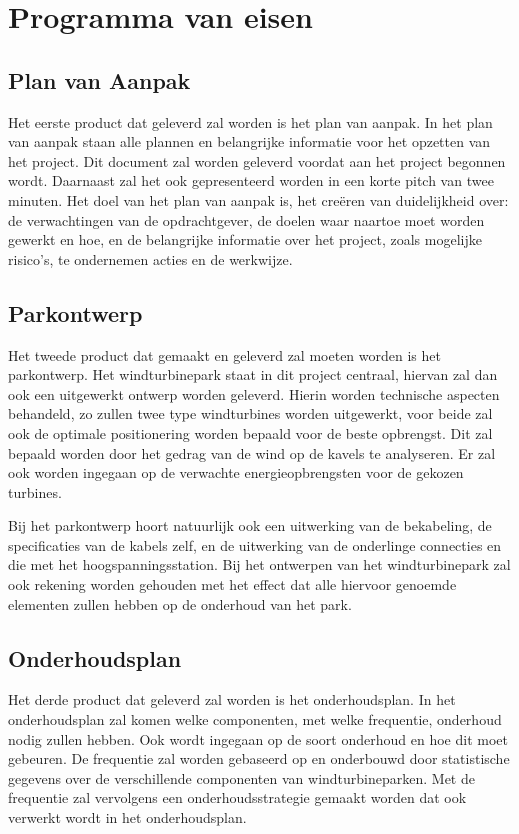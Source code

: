 \section{Programma van eisen}
\subsection{Plan van Aanpak}
Het eerste product dat geleverd zal worden is het plan van aanpak. In het plan van aanpak staan alle plannen en belangrijke informatie voor het opzetten van het project. Dit document zal worden geleverd voordat aan het project begonnen wordt. Daarnaast zal het ook gepresenteerd worden in een korte pitch van twee minuten. Het doel van het plan van aanpak is, het creëren van duidelijkheid over: de verwachtingen van de opdrachtgever, de doelen waar naartoe moet worden gewerkt en hoe, en de belangrijke informatie over het project, zoals mogelijke risico's, te ondernemen acties en de werkwijze. 

\subsection{Parkontwerp}
Het tweede product dat gemaakt en geleverd zal moeten worden is het parkontwerp. Het windturbinepark staat in dit project centraal, hiervan zal dan ook een uitgewerkt ontwerp worden geleverd. Hierin worden technische aspecten behandeld, zo zullen twee type windturbines worden uitgewerkt, voor beide zal ook de optimale positionering worden bepaald voor de beste opbrengst. Dit zal bepaald worden door het gedrag van de wind op de kavels te analyseren. Er zal ook worden ingegaan op de verwachte energieopbrengsten voor de gekozen turbines. 

Bij het parkontwerp hoort natuurlijk ook een uitwerking van de bekabeling, de specificaties van de kabels zelf, en de uitwerking van de onderlinge connecties en die met het hoogspanningsstation. Bij het ontwerpen van het windturbinepark zal ook rekening worden gehouden met het effect dat alle hiervoor genoemde elementen zullen hebben op de onderhoud van het park. 

\subsection{Onderhoudsplan}
Het derde product dat geleverd zal worden is het onderhoudsplan. In het onderhoudsplan zal komen welke componenten, met welke frequentie, onderhoud nodig zullen hebben. Ook wordt ingegaan op de soort onderhoud en hoe dit moet gebeuren. De frequentie zal worden gebaseerd op en onderbouwd door statistische gegevens over de verschillende componenten van windturbineparken. Met de frequentie zal vervolgens een onderhoudsstrategie gemaakt worden dat ook verwerkt wordt in het onderhoudsplan. 

